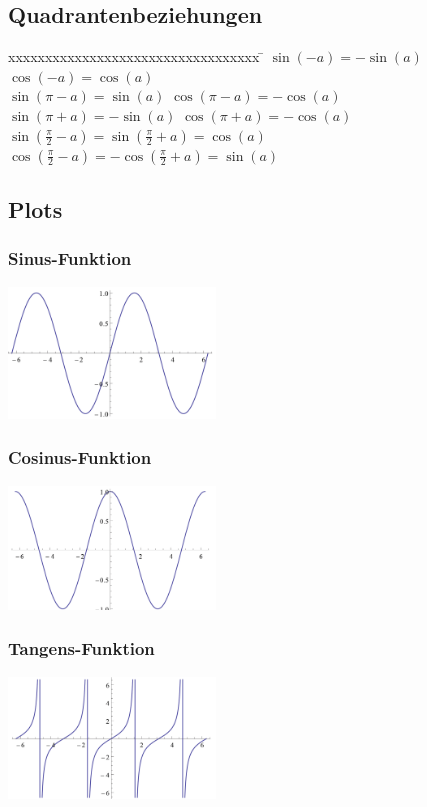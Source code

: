 \subsection{Quadrantenbeziehungen}
\begin{tabbing}
	xxxxxxxxxxxxxxxxxxxxxxxxxxxxxxxxxx \= \kill
	$\sin(-a)=-\sin(a)$ \> $\cos(-a)=\cos(a)$\\
	$\sin(\pi - a)=\sin(a)$ \> $\cos(\pi - a)=-\cos(a)$\\
	$\sin(\pi + a)=-\sin(a)$ \> $\cos(\pi +a)=-\cos(a)$\\
	$\sin\left(\frac{\pi}{2}-a \right)=\sin\left(\frac{\pi}{2}+a \right)=\cos(a)$ \>
	$\cos\left(\frac{\pi}{2}-a \right)=-\cos\left(\frac{\pi}{2}+a \right)=\sin(a)$  
\end{tabbing}

\subsection{Plots}
\begin{multicols}{3}
	\subsubsection{Sinus-Funktion}
	\includegraphics[width=5.5cm]{images/sin.png}
	\subsubsection{Cosinus-Funktion}
	\includegraphics[width=5.5cm]{images/cos.png}
	\subsubsection{Tangens-Funktion}
	\includegraphics[width=5.5cm]{images/tan.png}
\end{multicols}
\clearpage
\pagebreak